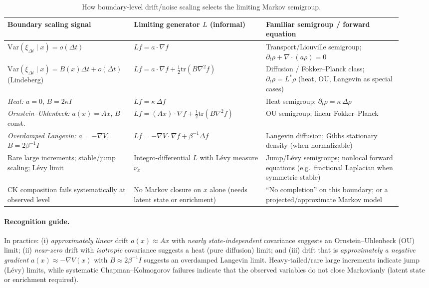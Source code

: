 \documentclass[11pt]{article}
\begin{document}
\begin{table}[H]
\centering
\caption{How boundary-level drift/noise scaling selects the limiting Markov semigroup.}
\label{tab:semigroup-taxonomy}
\begin{tabular}{@{}p{0.27\linewidth}p{0.32\linewidth}p{0.33\linewidth}@{}}
\toprule
Boundary scaling signal & Limiting generator $L$ (informal) & Familiar semigroup / forward equation \\
\midrule
$\mathrm{Var}(\xi_{\Delta t}\mid x)=o(\Delta t)$ &
$Lf=a\cdot \nabla f$ &
Transport/Liouville semigroup; $\partial_t\rho + \nabla\!\cdot(a\rho)=0$ \\
\addlinespace
$\mathrm{Var}(\xi_{\Delta t}\mid x)=B(x)\Delta t+o(\Delta t)$ (Lindeberg) &
$Lf=a\cdot\nabla f + \tfrac12\mathrm{tr}(B\nabla^2 f)$ &
Diffusion / Fokker--Planck class; $\partial_t\rho = L^\ast\rho$
(heat, OU, Langevin as special cases) \\
\addlinespace
\textit{Heat:} $a=0$, $B=2\kappa I$ & $Lf=\kappa\,\Delta f$ & Heat semigroup; $\partial_t\rho=\kappa\,\Delta\rho$ \\
\textit{Ornstein--Uhlenbeck:} $a(x)=Ax$, $B$ const. & $Lf=(Ax)\cdot\nabla f + \tfrac12\mathrm{tr}(B\nabla^2 f)$ & OU semigroup; linear Fokker--Planck \\
\textit{Overdamped Langevin:} $a=-\nabla V$, $B=2\beta^{-1}I$ & $Lf=-\nabla V\cdot\nabla f + \beta^{-1}\Delta f$ & Langevin diffusion; Gibbs stationary density (when normalizable) \\
\addlinespace
Rare large increments; stable/jump scaling; L\'evy limit &
Integro-differential $L$ with L\'evy measure $\nu_x$ &
Jump/L\'evy semigroups; nonlocal forward equations
(e.g.\ fractional Laplacian when symmetric stable) \\
CK composition fails systematically at observed level &
No Markov closure on $x$ alone (needs latent state or enrichment) &
``No completion'' on this boundary; or a projected/approximate Markov model \\
\bottomrule
\end{tabular}
\end{table}


\paragraph{Recognition guide.}
In practice: (i) \emph{approximately linear} drift $a(x)\approx Ax$ with
\emph{nearly state-independent} covariance suggests an
Ornstein--Uhlenbeck (OU) limit; (ii) \emph{near-zero} drift with
\emph{isotropic} covariance suggests a heat (pure diffusion) limit; and
(iii) drift that is \emph{approximately a negative gradient}
$a(x)\approx -\nabla V(x)$ with $B\approx 2\beta^{-1}I$ suggests an
overdamped Langevin limit. Heavy-tailed/rare large increments indicate
jump (L\'evy) limits, while systematic Chapman--Kolmogorov failures
indicate that the observed variables do not close Markovianly (latent
state or enrichment required).
\end{document}
